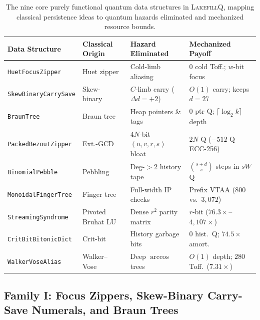 \documentclass[acmsmall,screen,anonymous]{acmart}
\DeclareRobustCommand{\_}{\ifmmode\text{\char95}\else\char95\penalty0\relax\fi}
\theoremstyle{plain}
\newcommand{\LakefillQ}{\textsc{LakefillQ}}
\begin{document}
\begin{table}[t]
\centering
\caption{The nine core purely functional quantum data structures in \LakefillQ{}, mapping classical persistence ideas to quantum hazards eliminated and mechanized resource bounds.}
\label{tab:t2}
\footnotesize
\setlength{\tabcolsep}{4pt}
\begin{tabular}{llll}
\toprule
Data Structure & Classical Origin & Hazard Eliminated & Mechanized Payoff \\
\midrule
\texttt{HuetFocusZipper} & Huet zipper~\cite{huet1997} & Cold-limb aliasing & $0$ cold Toff.; $w$-bit focus \\
\texttt{SkewBinaryCarrySave} & Skew-binary~\cite{myers1983} & $C$-limb carry ($\Delta d{=}{+}2$) & $O(1)$ carry; keeps $d=27$ \\
\texttt{BraunTree} & Braun tree~\cite{braun1983} & Heap pointers \& tags & $0$ ptr Q; $\lceil \log_2 k \rceil$ depth \\
\texttt{PackedBezoutZipper} & Ext.-GCD~\cite{bernsteinyang2019} & $4N$-bit $(u,v,r,s)$ bloat & $2N$ Q ($-512\text{ Q}$ ECC-256) \\
\texttt{BinomialPebble} & Pebbling~\cite{bennett1989,okasaki1998} & Deg-$>2$ history tape & $\binom{s+d}{s}$ steps in $s W$ Q \\
\texttt{MonoidalFingerTree} & Finger tree~\cite{hinze2006} & Full-width IP checks & Prefix VTAA ($800$ vs.\ $3{,}072$) \\
\texttt{StreamingSyndrome} & Pivoted Bruhat LU & Dense $r^2$ parity matrix & $r$-bit ($76.3\times$--$4{,}107\times$) \\
\texttt{CritBitBitonicDict} & Crit-bit~\cite{morrison1968,bentley1980} & History garbage bits & $0$ hist.\ Q; $74.5\times$ amort. \\
\texttt{WalkerVoseAlias} & Walker--Vose~\cite{walker1977,vose1991} & Deep $\arccos$ trees & $O(1)$ depth; $280$ Toff.\ ($7.31\times$) \\
\bottomrule
\end{tabular}
\end{table}

\subsection{Family I: Focus Zippers, Skew-Binary Carry-Save Numerals, and Braun Trees}
\label{sec:qds_fam1}
\end{document}

